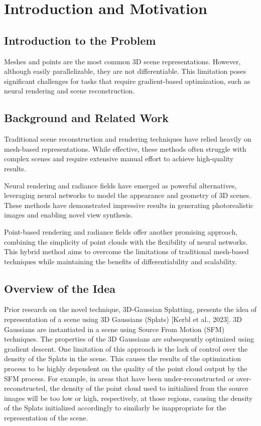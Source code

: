 \documentclass[11pt]{report}
\title{\titleinfo}
\author{\authorinfo}
\date{}
\begin{document}
\maketitle
\thispagestyle{empty} %

\tableofcontents

\chapter{Introduction and Motivation}
\section{Introduction to the Problem}
Meshes and points are the most common 3D scene representations. However, although easily parallelizable, they are not differentiable. This limitation poses significant challenges for tasks that require gradient-based optimization, such as neural rendering and scene reconstruction.

\section{Background and Related Work}
Traditional scene reconstruction and rendering techniques have relied heavily on mesh-based representations. While effective, these methods often struggle with complex scenes and require extensive manual effort to achieve high-quality results.

Neural rendering and radiance fields have emerged as powerful alternatives, leveraging neural networks to model the appearance and geometry of 3D scenes. These methods have demonstrated impressive results in generating photorealistic images and enabling novel view synthesis.

Point-based rendering and radiance fields offer another promising approach, combining the simplicity of point clouds with the flexibility of neural networks. This hybrid method aims to overcome the limitations of traditional mesh-based techniques while maintaining the benefits of differentiability and scalability.

\section{Overview of the Idea}
Prior research on the novel technique, 3D-Gaussian Splatting, presents the idea of representation of a scene using 3D Gaussians (Splats) [Kerbl et al., 2023]. 3D Gaussians are instantiated in a scene using Source From Motion (SFM) techniques. The properties of the 3D Gaussians are subsequently optimized using gradient descent. One limitation of this approach is the lack of control over the density of the Splats in the scene. This causes the results of the optimization process to be highly dependent on the quality of the point cloud output by the SFM process. For example, in areas that have been under-reconstructed or over-reconstructed, the density of the point cloud used to initialized from the source images will be too low or high, respectively, at those regions, causing the density of the Splats initialized accordingly to similarly be inappropriate for the representation of the scene.
\end{document}
